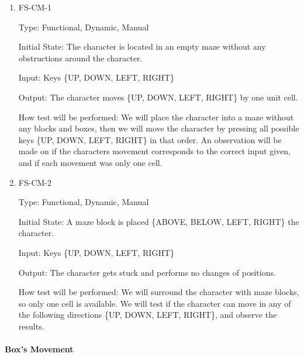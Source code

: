 \documentclass[12pt, titlepage]{article}
\begin{document}
\begin{enumerate}

\item{FS-CM-1\\}

Type: Functional, Dynamic, Manual
					
Initial State: The character is located in an empty maze without any obstructions around the character.
					
Input: Keys \{UP, DOWN, LEFT, RIGHT\}
					
Output: The character moves \{UP, DOWN, LEFT, RIGHT\} by one unit cell.
					
How test will be performed: We will place the character into a maze without any blocks and boxes, then we will move the character by pressing all possible keys \{UP, DOWN, LEFT, RIGHT\} in that order. An observation will be made on if the characters movement corresponds to the correct input given, and if each movement was only one cell.

\item{FS-CM-2\\}

Type: Functional, Dynamic, Manual
					
Initial State: A maze block is placed \{ABOVE, BELOW, LEFT, RIGHT\} the character.
					
Input: Keys \{UP, DOWN, LEFT, RIGHT\}
					
Output: The character gets stuck and performs no changes of positions. 
					
How test will be performed: We will surround the character with maze blocks, so only one cell is available. We will test if the character can move in any of the following directions \{UP, DOWN, LEFT, RIGHT\}, and observe the results.

\end{enumerate}
				
\paragraph{Box's Movement}
\end{document}

